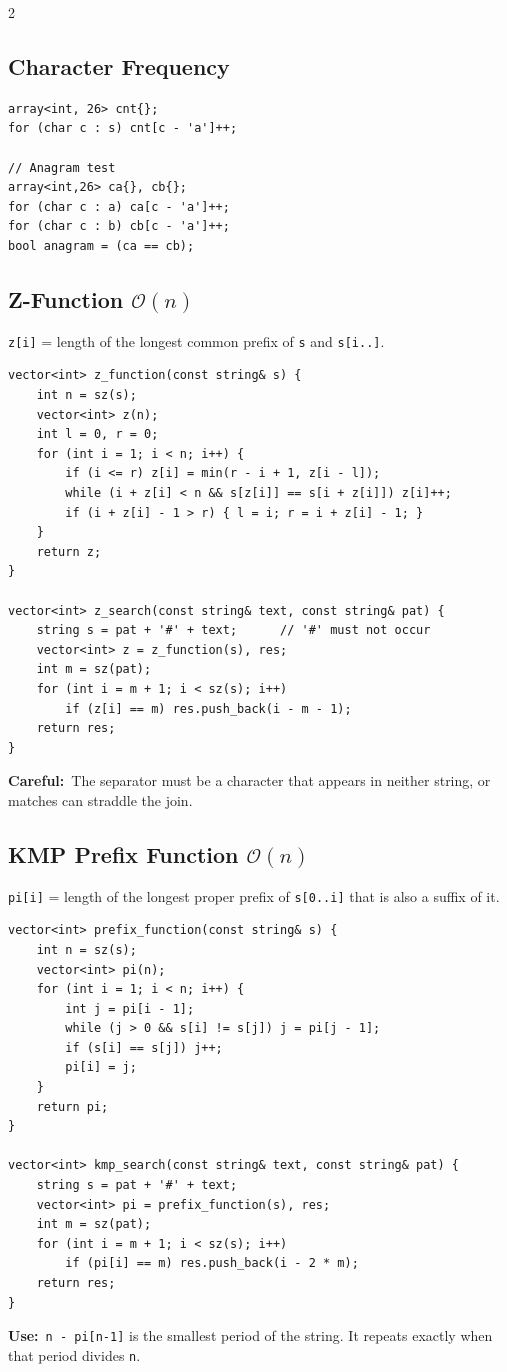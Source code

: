 \documentclass[10pt]{article}
\newcommand{\code}[1]{\texttt{\small #1}}
\newcommand{\sub}[2]{\subsection[#1]{#1\hspace{0.6em}%
  \textnormal{\color{accent2}\small$\mathcal{O}(#2)$}}}
\newcommand{\uses}[1]{{\color{accent2}\footnotesize\textbf{Use:}}~{\footnotesize #1}\par}
\newcommand{\warn}[1]{{\color{warnc}\footnotesize\textbf{Careful:}}~{\footnotesize #1}\par}
\begin{document}
\begin{multicols}{2}
\subsection{Character Frequency}
\begin{lstlisting}
array<int, 26> cnt{};
for (char c : s) cnt[c - 'a']++;

// Anagram test
array<int,26> ca{}, cb{};
for (char c : a) ca[c - 'a']++;
for (char c : b) cb[c - 'a']++;
bool anagram = (ca == cb);
\end{lstlisting}

\sub{Z-Function}{n}
\code{z[i]} = length of the longest common prefix of \code{s} and
\code{s[i..]}.
\begin{lstlisting}
vector<int> z_function(const string& s) {
    int n = sz(s);
    vector<int> z(n);
    int l = 0, r = 0;
    for (int i = 1; i < n; i++) {
        if (i <= r) z[i] = min(r - i + 1, z[i - l]);
        while (i + z[i] < n && s[z[i]] == s[i + z[i]]) z[i]++;
        if (i + z[i] - 1 > r) { l = i; r = i + z[i] - 1; }
    }
    return z;
}

vector<int> z_search(const string& text, const string& pat) {
    string s = pat + '#' + text;      // '#' must not occur
    vector<int> z = z_function(s), res;
    int m = sz(pat);
    for (int i = m + 1; i < sz(s); i++)
        if (z[i] == m) res.push_back(i - m - 1);
    return res;
}
\end{lstlisting}
\warn{The separator must be a character that appears in neither string,
or matches can straddle the join.}

\sub{KMP Prefix Function}{n}
\code{pi[i]} = length of the longest proper prefix of \code{s[0..i]}
that is also a suffix of it.
\begin{lstlisting}
vector<int> prefix_function(const string& s) {
    int n = sz(s);
    vector<int> pi(n);
    for (int i = 1; i < n; i++) {
        int j = pi[i - 1];
        while (j > 0 && s[i] != s[j]) j = pi[j - 1];
        if (s[i] == s[j]) j++;
        pi[i] = j;
    }
    return pi;
}

vector<int> kmp_search(const string& text, const string& pat) {
    string s = pat + '#' + text;
    vector<int> pi = prefix_function(s), res;
    int m = sz(pat);
    for (int i = m + 1; i < sz(s); i++)
        if (pi[i] == m) res.push_back(i - 2 * m);
    return res;
}
\end{lstlisting}
\uses{\code{n - pi[n-1]} is the smallest period of the string. It repeats
exactly when that period divides \code{n}.}


\end{multicols}
\end{document}

